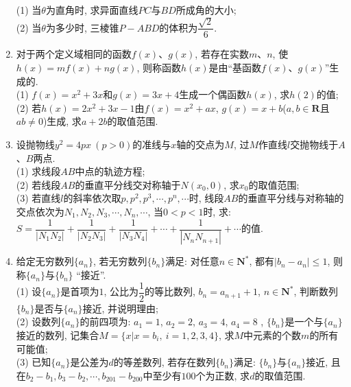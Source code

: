 \documentclass[10pt,a4paper]{article}
\begin{document}
\begin{enumerate}[1.]
\begin{center}
\end{center}
(1) 当$\theta$为直角时, 求异面直线$PC$与$BD$所成角的大小;\\
(2) 当$\theta$为多少时, 三棱锥$P-ABD$的体积为$\dfrac{\sqrt 2}6$.
\item 对于两个定义域相同的函数$f(x)$、$g(x)$, 若存在实数$m$、$n$, 使$h(x)=mf(x)+ng(x)$, 则称函数$h(x)$是由``基函数$f(x)$、$g(x)$''生成的.\\
(1) $f(x)=x^2+3x$和$g(x)=3x+4$生成一个偶函数$h(x)$, 求$h(2)$的值;\\
(2) 若$h(x)=2x^2+3x-1$由$f(x)=x^2+ax$, $g(x)=x+b$($a,b\in \mathbf{R}$且$ab\ne 0$)生成, 求$a+2b$的取值范围.
\item 设抛物线$y^2=4px\ (p>0)$的准线与$x$轴的交点为$M$, 过$M$作直线$l$交抛物线于$A$、$B$两点.\\
(1) 求线段$AB$中点的轨迹方程;\\
(2) 若线段$AB$的垂直平分线交对称轴于$N(x_0,0)$, 求$x_0$的取值范围;\\
(3) 若直线$l$的斜率依次取$p, p^2,p^3,\cdots ,p^n,\cdots$时, 线段$AB$的垂直平分线与对称轴的交点依次为$N_1, N_2, N_3,\cdots ,N_n, \cdots$, 当$0<p<1$时, 求: $S=\dfrac 1{|N_1N_2|}+\dfrac 1{|N_2N_3|}+\dfrac 1{|N_3N_4|}+\cdots +\dfrac 1{|N_nN_{n+1}|}+\cdots$的值.
\item 给定无穷数列$\{a_n\}$, 若无穷数列$\{b_n\}$满足: 对任意$n\in \mathbf{N}^*$, 都有$|b_n-a_n|\le 1$, 则称$\{a_n\}$与$\{b_n\}$ ``接近''.\\
(1) 设$\{a_n\}$是首项为$1$, 公比为$\dfrac 12$的等比数列, $b_n=a_{n+1}+1$, $n\in \mathbf{N}^*$, 判断数列$\{b_n\}$是否与$\{a_n\}$接近, 并说明理由;\\
(2) 设数列$\{a_n\}$的前四项为: $a_1=1$, $a_2=2$, $a_3=4$, $a_4=8$ , $\{b_n\}$是一个与$\{a_n\}$接近的数列, 记集合$M=\{x|x=b_i,\ i=1,2,3,4\}$, 求$M$中元素的个数$m$的所有可能值;\\
(3) 已知$\{a_n\}$是公差为$d$的等差数列, 若存在数列$\{b_n\}$满足: $\{b_n\}$与$\{a_n\}$接近, 且在$b_2-b_1,b_3-b_2,\cdots,b_{201}-b_{200}$中至少有$100$个为正数, 求$d$的取值范围.



\end{enumerate}
\end{document}
